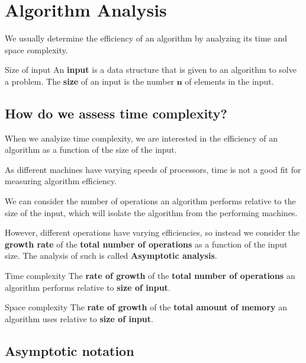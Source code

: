 \section{Algorithm Analysis}

We usually determine the efficiency of an algorithm by analyzing its time and space complexity.

\begin{definition}
    {Size of input}
    An \textbf{input} is a data structure that is given to an algorithm to solve a problem.
    The \textbf{size} of an input is the number $\mathbf{n}$ of elements in the input.
\end{definition}

\subsection{How do we assess time complexity?}

When we analyize time complexity, we are interested in the efficiency of an algorithm as a function of the size of the input.

As different machines have varying speeds of processors, time is not a good fit for measuring algorithm efficiency.

We can consider the number of operations an algorithm performs relative to the size of the input, which will isolate the algorithm from the performing machines.

However, different operations have varying efficiencies, so instead we consider the \textbf{growth rate} of the \textbf{total number of operations} as a function of the input size. The analysis of such is called \textbf{Asymptotic analysis}.


\begin{definition}
    {Time complexity}
    The \textbf{rate of growth} of the \textbf{total number of operations} an algorithm performs relative to \textbf{size of input}.
\end{definition}

\begin{definition}
    {Space complexity}
    The \textbf{rate of growth} of the \textbf{total amount of memory} an algorithm uses relative to \textbf{size of input}.
\end{definition}

\subsection{Asymptotic notation}

